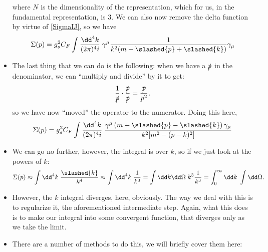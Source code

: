 \begin{itemize}
\begin{equation}
        \end{equation}
        where $N$ is the dimensionality of the representation, which for us, in the fundamental representation, is 3. We can also now remove the delta function by virtue of \eqref{SigmaIJ}, so we have
        \begin{equation}
            \Sigma(p) = g_s^2 C_F \int \frac{\dd^4 k}{(2\pi)^4i}\; \gamma^{\mu} \frac{1}{k^2(m-\slashed{p} + \slashed{k})}\gamma_{\mu}
        \end{equation}
    \item The last thing that we can do is the following: when we have a $\slashed{p}$ in the denominator, we can ``multiply and divide'' by it to get:
        \begin{equation}
            \frac{1}{\slashed{p}} \cdot \frac{\slashed{p}}{\slashed{p}} = \frac{\slashed{p}}{p^2},
        \end{equation}
        so we have now ``moved'' the operator to the numerator. Doing this here,
        \begin{equation}
            \Sigma(p) = g_s^2 C_F \int \frac{\dd^4 k}{(2\pi)^4i}\;  \frac{\gamma^{\mu} \left(m + \slashed{p} - \slashed{k}\right) \gamma_{\mu}}{k^2[m^2 - (p - k)^2]}
        \end{equation}
    \item We can go no further, however, the integral is over $k$, so if we just look at the powers of $k$:
        \begin{equation}
            \Sigma(p) \approx \int \dd^4 k\;  \frac{\slashed{k}}{k^4} \approx \int \dd^4 k\;  \frac{1}{k^3} = \int \dd k \dd\Omega\; k^3 \frac{1}{k^3} = \int_0^{\infty} \dd k\; \int\dd\Omega.
        \end{equation}
    \item However, the $k$ integral diverges, here, obviously. The way we deal with this is to regularize it, the aforementioned intermediate step. Again, what this does is to make our integral into some convergent function, that diverges only as we take the limit. 
    \item There are a number of methods to do this, we will briefly cover them here:
\end{itemize}

